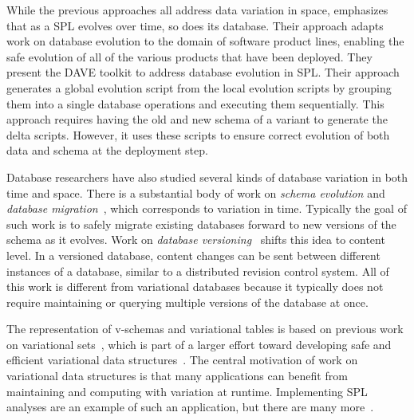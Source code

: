 While the previous approaches all address data variation in space, 
\cite{dbSPLevolve} emphasizes that as a SPL evolves over time, so does its
database. Their approach adapts work on database evolution to the
domain of software product lines, enabling the safe evolution of all of the
various products that have been deployed.
%
 They present the DAVE toolkit to address database evolution in SPL. Their
 approach generates a global evolution script from the local evolution scripts
 by grouping them into a single database operations and executing them
 sequentially. This approach requires having the old and new schema of a
 variant to generate the delta scripts. However, it uses these scripts to
 ensure correct evolution of both data and schema at the deployment step. 


Database researchers have also studied several kinds of database variation in
both time and space. There is a substantial body of work on \emph{schema
evolution} and \emph{database
migration}~\cite{Prism08Curino,prima08Moon,schEvolUnifyApp,schEvolIssues03Ram},
which corresponds to variation in time. Typically the goal of such work is to
safely migrate existing databases forward to new versions of the schema as it
evolves. 
%
Work on \emph{database versioning}~\cite{datasetVersioning,dbVersioning}
shifts this idea to content level. In a versioned database, 
content changes can be sent between different instances of a database,
similar to a distributed revision control system.
%
All of this work is different from variational databases because it typically
does not require maintaining or querying multiple versions of the database at
once.
%


The representation of v-schemas and variational tables is based on
previous work on variational sets~\cite{EWC13fosd}, which is part of a larger
effort toward developing safe and efficient variational data
structures~\cite{Walk14onward,MMWWK17vamos}. The central motivation of work on
variational data structures is that many applications can benefit from
maintaining and computing with variation at runtime. Implementing SPL analyses
are an example of such an application, but there are many
more~\cite{Walk14onward}.
%


